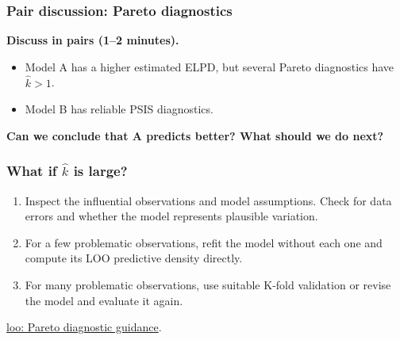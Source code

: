 \documentclass[10pt]{beamer}
\begin{document}
\begin{frame}[fragile]
\frametitle{Pair discussion: Pareto diagnostics}

  {\color{uured}\textbf{Discuss in pairs (1--2 minutes).}}

  \begin{itemize}
    \item Model A has a higher estimated ELPD, but several
      Pareto diagnostics have $\widehat k>1$.
    \item Model B has reliable PSIS diagnostics.
  \end{itemize}

  \textbf{Can we conclude that A predicts better?
    What should we do next?}

\end{frame}

\begin{frame}
\frametitle{What if $\widehat k$ is large?}

  \begin{enumerate}
  \item<1-> Inspect the influential observations and model assumptions.
    Check for data errors and whether the model represents plausible variation.
  \item<2-> For a few problematic observations, refit the model without
    each one and compute its LOO predictive density directly.
  \item<3-> For many problematic observations, use suitable K-fold validation
    or revise the model and evaluate it again.
  \end{enumerate}


  {\scriptsize \href{https://mc-stan.org/loo/reference/pareto-k-diagnostic.html}{loo: Pareto diagnostic guidance}.}
\end{frame}
\end{document}
